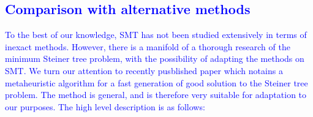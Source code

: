 \textcolor{blue}{\subsection{Comparison with alternative methods}}

\textcolor{blue}{
To the best of our knowledge, SMT has not been studied extensively in terms of inexact methods.
However, there is a manifold of a thorough research of the minimum Steiner tree problem, with the possibility of adapting the methods on SMT.
We turn our attention to recently pusblished paper \citet{pajor18} which notains a metaheuristic algorithm for a fast generation of good solution to the Steiner tree problem.
The method is general, and is therefore very suitable for adaptation to our purposes.
The high level description is as follows:}

